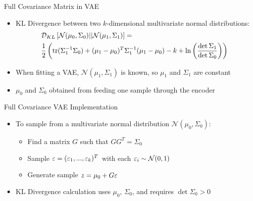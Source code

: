 \documentclass{beamer}
\def \e{\ensuremath \varepsilon}
\def \tr{\ensuremath \text{tr}}
\theoremstyle{definition}
\begin{document}
\begin{frame}{Full Covariance Matrix in VAE}
\begin{itemize}
  \item KL Divergence between two $k$-dimensional multivariate normal distributions:
\begin{align*}
&\mathcal{D}_{KL}\left[\mathcal{N}(\mu_0, \Sigma_0) || \mathcal{N}(\mu_1, \Sigma_1)\right] = \\
&\frac{1}{2} \left(\tr(\Sigma_1^{-1} \Sigma_0) + (\mu_1 - \mu_0)^T \Sigma_1^{-1} (\mu_1 - \mu_0) - k + \ln\left(\frac{\det \Sigma_1}{\det \Sigma_0} \right) \right)
\end{align*}
  \item<2-> When fitting a VAE, $\mathcal{N}(\mu_1, \Sigma_1)$ is known, so $\mu_1$ and $\Sigma_1$ are constant
  \item<2-> $\mu_0$ and $\Sigma_0$ obtained from feeding one sample through the encoder
\end{itemize}
\end{frame}


\begin{frame}{Full Covariance VAE Implementation}
\begin{itemize}
  \item To sample from a multivariate normal distribution $\mathcal{N}(\mu_0, \Sigma_0)$:
  \begin{itemize}
    \item Find a matrix $G$ such that $G G^T = \Sigma_0$
    \item Sample $\e = (\e_1,...,\e_k)^T$ with each $\e_i \sim \mathcal{N}(0,1)$
    \item Generate sample $z = \mu_0 + G\e$
  \end{itemize}
  \item<2-> KL Divergence calculation uses $\mu_0$, $\Sigma_0$, and requires $\det \Sigma_0 > 0$
\end{itemize}
\begin{figure}
\end{figure}
\end{frame}
\end{document}

